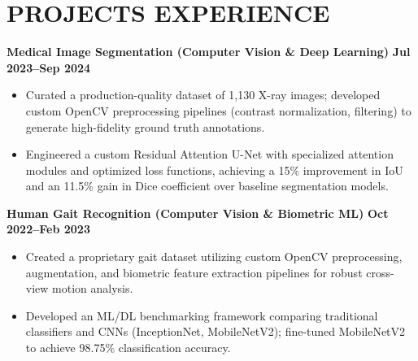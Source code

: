 \documentclass[a4paper,10pt]{article}
\begin{document}
\section{\textbf{PROJECTS EXPERIENCE}}
\vspace{0pt}

\noindent\textbf{Medical Image Segmentation (Computer Vision \& Deep Learning)} \hfill \textbf{Jul 2023--Sep 2024} \\
\begin{itemize}
    \vspace{-18pt}
    \item Curated a production-quality dataset of 1,130 X-ray images; developed custom OpenCV preprocessing pipelines (contrast normalization, filtering) to generate high-fidelity ground truth annotations. \vspace{-7pt}
    \item Engineered a custom Residual Attention U-Net with specialized attention modules and optimized loss functions, achieving a 15\% improvement in IoU and an 11.5\% gain in Dice coefficient over baseline segmentation models. \vspace{-7pt}
\end{itemize}

\vspace{3pt}
\noindent\textbf{Human Gait Recognition (Computer Vision \& Biometric ML)} \hfill \textbf{Oct 2022--Feb 2023} \\
\begin{itemize}
    \vspace{-18pt}
    \item Created a proprietary gait dataset utilizing custom OpenCV preprocessing, augmentation, and biometric feature extraction pipelines for robust cross-view motion analysis. \vspace{-7pt}
    \item Developed an ML/DL benchmarking framework comparing traditional classifiers and CNNs (InceptionNet, MobileNetV2); fine-tuned MobileNetV2 to achieve 98.75\% classification accuracy. \vspace{-7pt}
\end{itemize}

\vspace{-1pt}
\end{document}

